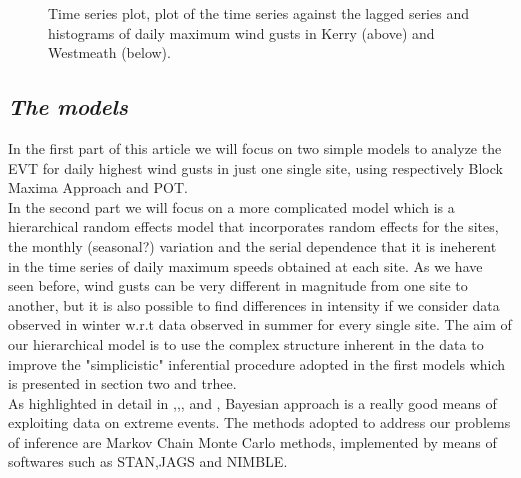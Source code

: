 \documentclass[preprint,12pt]{elsarticle}
\begin{document}
\begin{figure}[!h]
\captionsetup[subfigure]{labelformat=empty}
 \quad
{} \quad
\caption{Time series plot, plot of the time series against the lagged series and histograms of daily maximum wind gusts in Kerry (above) and Westmeath (below).}
\label{figure:Data}
\end{figure}

\subsection{\textit{The models}}
In the first part of this article we will focus on two simple models to analyze the EVT for daily highest wind gusts in just one single site, using respectively Block Maxima Approach and POT. \\
In the second part we will focus on a more complicated model which is a hierarchical random effects model that incorporates random effects for the sites, the monthly (seasonal?) variation and the serial dependence that it is ineherent in the time series of daily maximum speeds obtained at each site.
As we have seen before, wind gusts can be very different in magnitude from one site to another, but it is also possible to find differences in intensity if we consider data observed in winter w.r.t data observed in summer for every single site.
The aim of our hierarchical model is to use the complex structure inherent in the data to improve the "simplicistic" inferential procedure adopted in the first models which is presented in section two and trhee.
\\
As highlighted in detail in \cite{EVT:1},\cite{EVT:2},\cite{EVT:3}, \cite{EVT:4} and \cite{EVT:7}, Bayesian approach is a really good means of exploiting data on extreme events. The methods adopted to address our problems of inference are Markov Chain Monte Carlo methods, implemented by means of  softwares such as STAN,JAGS and NIMBLE.
\end{document}
